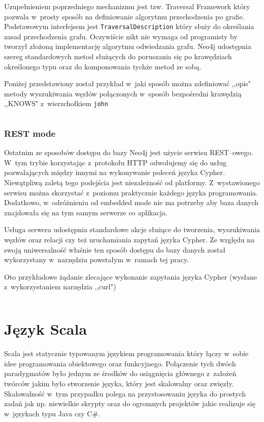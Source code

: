 \documentclass[brudnopis]{xmgr}
\begin{document}
Uzupełnieniem poprzedniego mechanizmu jest tzw. Traversal Framework który pozwala w~prosty sposób na definiowanie algorytmu przechodzenia po grafie. Podstawowym interfejsem jest \texttt{TraversalDescription} który służy do określania zasad przechodzenia grafu. Oczywiście nikt nie wymaga od programisty by tworzył złożoną implementację algorytmu odwiedzania grafu. Neo4j udostępnia szereg standardowych metod służących do poruszania się po krawędziach określonego typu oraz do komponowania tychże metod ze sobą.

Poniżej przedstawiony został przykład w~jaki sposób można zdefiniować ,,opis" metody wyszukiwania węzłów połączonych w~sposób bezpośredni krawędzią ,,KNOWS" z~wierzchołkiem \texttt{john}

\inputminted{java}{listings/java/neo4j-traversal-api-knows.java}

\subsection{REST mode}

Ostatnim ze sposobów dostępu do bazy Neo4j jest użycie serwisu REST--owego. W~tym trybie korzystając z~protokołu HTTP odwołujemy się do usług pozwalających między innymi na wykonywanie poleceń języka Cypher. Niewątpliwą zaletą tego podejścia jest niezależność od platformy. Z~wystawionego serwisu można skorzystać z~poziomu praktycznie każdego języka programowania. Dodatkowo, w~odróżnieniu od embedded mode nie ma potrzeby aby baza danych znajdowała się na tym samym serwerze co aplikacja.

Usługa serwera udostępnia standardowe akcje służące do tworzenia, wyszukiwania węzłów oraz relacji czy też uruchamiania zapytań języka Cypher. Ze względu na swoją uniwersalność właśnie ten sposób dostępu do bazy danych został wykorzystany w~narzędziu powstałym w~ramach tej pracy.

Oto przykładowe żądanie zlecające wykonanie zapytania języka Cypher (wysłane z~wykorzystaniem narzędzia ,,curl")

\inputminted{bash}{listings/bash/neo4j-rest-cypher.sh}

\chapter{Język Scala}

Scala jest statycznie typowanym językiem programowania który łączy w~sobie idee programowania obiektowego oraz funkcyjnego. Połączenie tych dwóch paradygmatów było jednym ze środków do osiągnięcia głównego z~założeń twórców jakim było stworzenie języka, który jest skalowalny oraz zwięzły. Skalowalność w~tym przypadku polega na przystosowaniu języka do prostych zadań jak np. niewielkie skrypty oraz do ogromnych projektów jakie realizuje się w~językach typu Java czy C\#.
\end{document}
